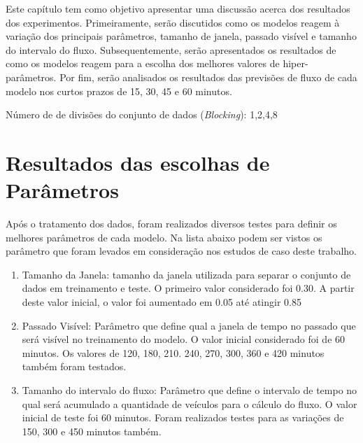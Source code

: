 





Este capítulo tem como objetivo apresentar uma discussão acerca dos resultados dos experimentos. Primeiramente, serão discutidos como os modelos reagem à variação dos principais parâmetros, tamanho de janela, passado visível e tamanho do intervalo do fluxo. Subsequentemente, serão apresentados os resultados de como os modelos reagem para a escolha dos melhores valores de hiper-parâmetros. Por fim, serão analisados os resultados das previsões de fluxo de cada modelo nos curtos prazos de 15, 30, 45 e 60 minutos.

Número de de divisões do conjunto de dados (\textit{Blocking}):  1,2,4,8 

\section{Resultados das escolhas de Parâmetros}

Após o tratamento dos dados, foram realizados diversos testes para definir os melhores parâmetros de cada modelo. Na lista abaixo podem ser vistos os parâmetro que foram levados em consideração nos estudos de caso deste trabalho.


\begin{enumerate}
	\item Tamanho da Janela: tamanho da janela utilizada para separar o conjunto de dados em treinamento e teste. O primeiro valor considerado foi 0.30. A partir deste valor inicial, o valor foi aumentado em 0.05 até atingir 0.85
	\item Passado Visível: Parâmetro que define qual a janela de tempo no passado que será visível no treinamento do modelo. O valor inicial considerado foi de 60 minutos. Os valores de 120, 180, 210. 240, 270, 300, 360 e 420 minutos também foram testados.
	\item Tamanho do intervalo do fluxo: Parâmetro que define o intervalo de tempo no qual será acumulado a quantidade de veículos para o cálculo do fluxo. O valor inicial de teste foi 60 minutos. Foram realizados testes para as variações de 150, 300 e 450 minutos também.
\end{enumerate}


